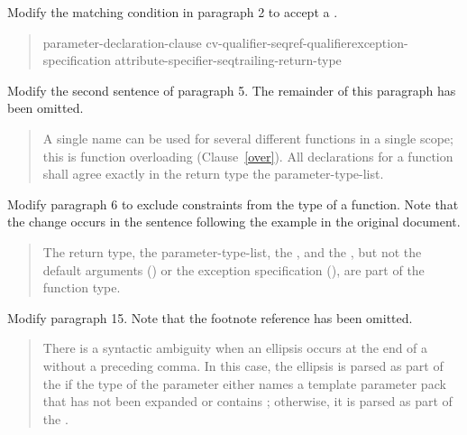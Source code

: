 Modify the matching condition in paragraph 2 to accept a 
.

\begin{quote}
\pnum
\begin{bnf}
 \terminal{(} parameter-declaration-clause \terminal{)}
  cv-qualifier-seq\opt ref-qualifier\opt exception-specification\opt
  attribute-specifier-seq\opt trailing-return-type 
\end{bnf}
\end{quote}


Modify the second sentence of paragraph 5. The remainder of this
paragraph has been omitted.

\begin{quote}
\setcounter{Paras}{4}
\pnum
A single name can be used for several different functions in a single 
scope; this is function overloading (Clause~\ref{over}). 
%
All declarations for a function shall agree exactly in  
the return type\added{,}  the parameter-type-list.
\end{quote}

Modify paragraph 6 to exclude constraints from the type of a function.
Note that the change occurs in the sentence following the example
in the original document.

\begin{quote}
\pnum
The return type, the parameter-type-list, the , 
and the , but not the default arguments
() or
the exception specification (), are part of the function 
type.
\end{quote}

Modify paragraph 15. Note that the footnote reference has been
omitted.

\begin{quote}
\setcounter{Paras}{14}
\pnum
There is a syntactic ambiguity when an ellipsis occurs at the end of a 
 without a preceding comma. In this 
case, the ellipsis is parsed as part of the  
if the type of the parameter either names a template parameter pack that has 
not been expanded or contains   ; otherwise, it is parsed as part 
of the .
\end{quote}

